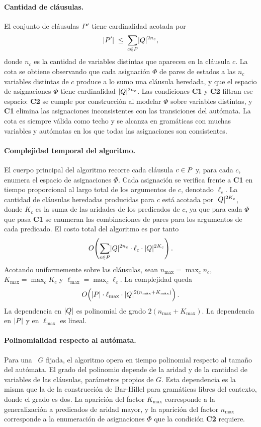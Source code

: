 \paragraph{Cantidad de cláusulas.} El conjunto de cláusulas $P'$ tiene cardinalidad acotada por
\[
\lvert P' \rvert \;\leq\; \sum_{c \in P} \lvert Q \rvert^{2 n_c},
\]
donde $n_c$ es la cantidad de variables distintas que aparecen en la cláusula $c$. La cota se obtiene observando que cada asignación $\Phi$ de pares de estados a las $n_c$ variables distintas de $c$ produce a lo sumo una cláusula heredada, y que el espacio de asignaciones $\Phi$ tiene cardinalidad $\lvert Q \rvert^{2 n_c}$. Las condiciones \textbf{C1} y \textbf{C2} filtran ese espacio: \textbf{C2} se cumple por construcción al modelar $\Phi$ sobre variables distintas, y \textbf{C1} elimina las asignaciones inconsistentes con las transiciones del autómata. La cota es siempre válida como techo y se alcanza en gramáticas con muchas variables y autómatas en los que todas las asignaciones son consistentes.

\paragraph{Complejidad temporal del algoritmo.} El cuerpo principal del algoritmo recorre cada cláusula $c \in P$ y, para cada $c$, enumera el espacio de asignaciones $\Phi$. Cada asignación se verifica frente a \textbf{C1} en tiempo proporcional al largo total de los argumentos de $c$, denotado $\ell_c$. La cantidad de cláusulas heredadas producidas para $c$ está acotada por $\lvert Q \rvert^{2 K_c}$, donde $K_c$ es la suma de las aridades de los predicados de $c$, ya que para cada $\Phi$ que pasa \textbf{C1} se enumeran las combinaciones de pares para los argumentos de cada predicado. El costo total del algoritmo es por tanto
\[
O\!\left( \sum_{c \in P} \lvert Q \rvert^{2 n_c} \cdot \ell_c \cdot \lvert Q \rvert^{2 K_c} \right).
\]
Acotando uniformemente sobre las cláusulas, sean $n_{\max} = \max_c n_c$, $K_{\max} = \max_c K_c$ y $\ell_{\max} = \max_c \ell_c$. La complejidad queda
\[
O\!\left( \lvert P \rvert \cdot \ell_{\max} \cdot \lvert Q \rvert^{2(n_{\max} + K_{\max})} \right).
\]
La dependencia en $\lvert Q \rvert$ es polinomial de grado $2(n_{\max} + K_{\max})$. La dependencia en $\lvert P \rvert$ y en $\ell_{\max}$ es lineal.

\paragraph{Polinomialidad respecto al autómata.} Para una \PRCG\ $G$ fijada, el algoritmo opera en tiempo polinomial respecto al tamaño del autómata. El grado del polinomio depende de la aridad y de la cantidad de variables de las cláusulas, parámetros propios de $G$. Esta dependencia es la misma que la de la construcción de Bar-Hillel para gramáticas libres del contexto, donde el grado es dos. La aparición del factor $K_{\max}$ corresponde a la generalización a predicados de aridad mayor, y la aparición del factor $n_{\max}$ corresponde a la enumeración de asignaciones $\Phi$ que la condición \textbf{C2} requiere.

